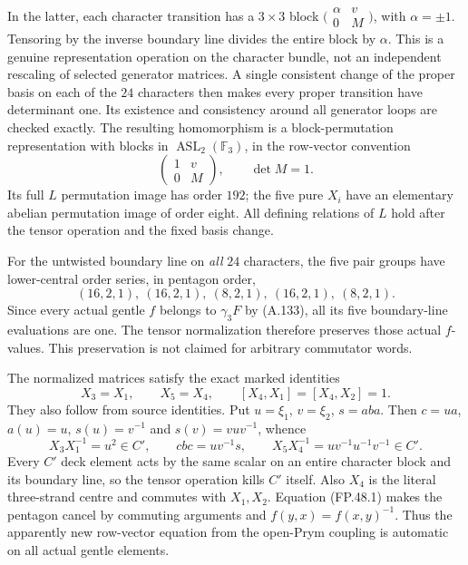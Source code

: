 In the latter, each character transition has a $3\times3$
block $\bigl(\begin{smallmatrix}\alpha&v\\0&M\end{smallmatrix}\bigr)$,
with $\alpha=\pm1$. Tensoring by the inverse boundary line
divides the entire block by $\alpha$. This is a genuine
representation operation on the character bundle, not an
independent rescaling of selected generator matrices. A
single consistent change of the proper basis on each of the
$24$ characters then makes every proper transition have
determinant one. Its existence and consistency around all
generator loops are checked exactly. The resulting
homomorphism is a block-permutation representation with
blocks in $\operatorname{ASL}_2(\mathbb F_3)$, in the
row-vector convention
\[
                  \begin{pmatrix}1&v\\0&M\end{pmatrix},
                         \qquad \det M=1.
\]
Its full $L$ permutation image has order $192$; the five
pure $X_i$ have an elementary abelian permutation image of
order eight. All defining relations of $L$ hold after the
tensor operation and the fixed basis change.

For the untwisted boundary line on \emph{all} $24$ characters,
the five pair groups have lower-central order series, in
pentagon order,
\[
        (16,2,1),\ (16,2,1),\ (8,2,1),\
        (16,2,1),\ (8,2,1).
\]
Since every actual gentle $f$ belongs to $\gamma_3F$ by
(A.133), all its five boundary-line evaluations are one.
The tensor normalization therefore preserves those actual
$f$-values. This preservation is not claimed for arbitrary
commutator words.

The normalized matrices satisfy the exact marked identities
\[
 X_3=X_1,\qquad X_5=X_4,\qquad
 [X_4,X_1]=[X_4,X_2]=1.
 \tag{FP.48.1}
\]
They also follow from source identities. Put
$u=\xi_1$, $v=\xi_2$, $s=aba$. Then
$c=ua$, $a(u)=u$, $s(u)=v^{-1}$ and $s(v)=vuv^{-1}$, whence
\[
 X_3X_1^{-1}=u^2\in C',\qquad
 cbc=uv^{-1}s,\qquad
 X_5X_4^{-1}=uv^{-1}u^{-1}v^{-1}\in C'.
\]
Every $C'$ deck element acts by the same scalar on an
entire character block and its boundary line, so the tensor
operation kills $C'$ itself. Also $X_4$ is the literal
three-strand centre and commutes with $X_1,X_2$.
Equation (FP.48.1) makes the pentagon cancel by commuting
arguments and $f(y,x)=f(x,y)^{-1}$. Thus the apparently new
row-vector equation from the open-Prym coupling is automatic
on all actual gentle elements.

